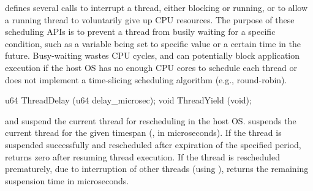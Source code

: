 
\Thehostabi{} defines several calls to interrupt a thread, either blocking or running,
or to allow a running thread to voluntarily give up CPU resources.
The purpose of these scheduling APIs is to prevent a thread from busily waiting for a specific condition,
such as a variable being set to specific value or a certain time in the future.
Busy-waiting wastes CPU cycles,
and can potentially block application execution
if the host OS
has no enough CPU cores to schedule each thread or does not
implement a time-slicing scheduling algorithm (e.g., round-robin).






\begin{paldef}
u64  ThreadDelay (u64 delay_microsec);
void ThreadYield (void);
\end{paldef}


 and  suspend the current thread for rescheduling in the host OS.
 suspends the current thread
for the given timespan (, in microseconds).
If the thread is suspended successfully and rescheduled after expiration of the specified period,
 returns zero after resuming thread execution.
If the thread is rescheduled prematurely, due to interruption of other threads (using ),
 returns the remaining suspension time in microseconds.


